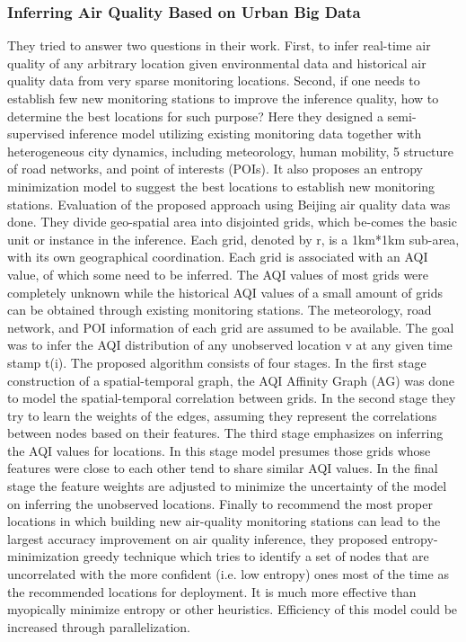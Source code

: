 \subsubsection{Inferring Air Quality Based on Urban Big Data \cite{26}} 
They tried to answer two questions in their work. First, to infer real-time air quality of any arbitrary location given environmental data and historical air quality data from very sparse monitoring locations. Second, if one needs to establish few new monitoring stations to improve the inference quality, how to determine the best locations for such purpose? Here they designed a semi-supervised inference model utilizing existing monitoring data together with heterogeneous city dynamics, including meteorology, human mobility, 5 structure of road networks, and point of interests (POIs). It also proposes an entropy minimization model to suggest the best locations to establish new monitoring stations. Evaluation of the proposed approach using Beijing air quality data was done. They divide geo-spatial area into disjointed grids, which be-comes the basic unit or instance in the inference. Each grid, denoted by r, is a 1km*1km sub-area, with its own geographical coordination. Each grid is associated with an AQI value, of which some need to be inferred. The AQI values of most grids were completely unknown while the historical AQI values of a small amount of grids can be obtained through existing monitoring stations. The meteorology, road network, and POI information of each grid are assumed to be available. The goal was to infer the AQI distribution of any unobserved location v at any given time stamp t(i). The proposed algorithm consists of four stages. In the first stage construction of a spatial-temporal graph, the AQI Affinity Graph (AG) was done to model the spatial-temporal correlation between grids. In the second stage they try to learn the weights of the edges, assuming they represent the correlations between nodes based on their features. The third stage emphasizes on inferring the AQI values for locations. In this stage model presumes those grids whose features were close to each other tend to share similar AQI values. In the final stage the feature weights are adjusted to minimize the uncertainty of the model on inferring the unobserved locations. Finally to recommend the most proper locations in which building new air-quality monitoring stations can lead to the largest accuracy improvement on air quality inference, they proposed entropy-minimization greedy technique which tries to identify a set of nodes that are uncorrelated with the more confident (i.e. low entropy) ones most of the time as the recommended locations for deployment. It is much more effective than myopically minimize entropy or other heuristics. Efficiency of this model could be increased through parallelization.
